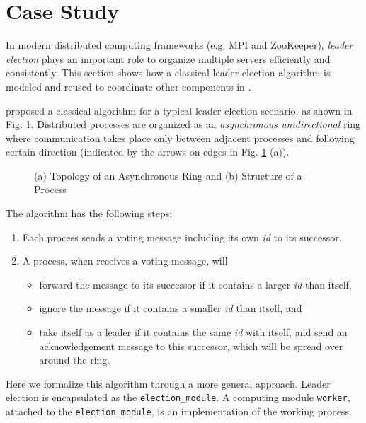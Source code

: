 \section{Case Study}
\label{sec:casestudy}

In modern distributed computing frameworks (e.g. MPI\cite{mpibook} and ZooKeeper\cite{JunqueiraZab2011}), \emph{leader election} plays an important role to organize multiple servers efficiently and consistently. This section shows how a classical leader election algorithm is modeled and reused to coordinate other components in \lang{}.

\cite{HagitDistributed2004} proposed a classical algorithm for a typical leader election scenario, as shown in Fig. \ref{fig:leaderelection}. Distributed processes are organized as an \emph{asynchronous unidirectional} ring where communication takes place only between adjacent processes and following certain direction (indicated by the arrows on edges in Fig. \ref{fig:leaderelection} (a)).

\begin{figure}
	\centering
	\resizebox{.8\textwidth}{!}{
        
    }
	\caption{(a) Topology of an Asynchronous Ring and (b) Structure of a Process}
	\label{fig:leaderelection}
\end{figure}

The algorithm has the following steps:
\begin{enumerate}
	\item Each process sends a voting message including its own \emph{id} to its successor.
	\item A process, when receives a voting message, will
	\begin{itemize}
		\item forward the message to its successor if it contains a larger \emph{id} than itself,
		\item ignore the message if it contains a smaller \emph{id} than itself, and
		\item take itself as a leader if it contains the same \emph{id} with itself, and send an acknowledgement message to this successor, which will be spread over around the ring.
	\end{itemize} 
\end{enumerate}

Here we formalize this algorithm through a more general approach. Leader election is encapsulated as the \texttt{election\_module}. A computing module \texttt{worker},  attached to the \texttt{election\_module}, is an implementation of the working process. 

